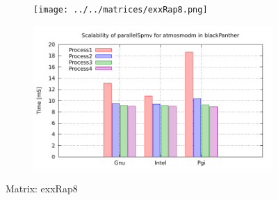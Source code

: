 \begin{figure} [ht!]
    \centering
    \captionsetup{justification=centering, singlelinecheck=false}
    \begin{subfigure}{.65\textwidth}
      \centering
      \hspace*{-3.5cm} 
      \texttt{[image: ../../matrices/exxRap8.png]}
      \label{fig:exxRap8_matrix}
    \end{subfigure}%
    \begin{subfigure}{.65\textwidth}
      \centering
      \hspace*{-6.0cm} 
      \includegraphics[page=3, width=0.95\linewidth]{../plots/blackPanther.pdf}
      \label{fig:exxRap8_performance}
    \end{subfigure}
\caption{Matrix: exxRap8}
\label{fig:exxRap8}
\end{figure}

